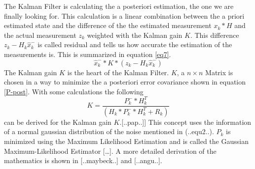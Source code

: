 The Kalman Filter is calculating the a posteriori estimation, the one we are finally looking for. This calculation is a linear combination between the a priori estimated state and the difference of the the estimated measurement $x_k*H$ and the actual measurement $z_k$ weighted with the Kalman gain $K$. This difference $z_k-H_k\hat{x}^{-}_k$ is  called residual and tells us how accurate the estimation of the measurements is. This is summarized in equation \ref{eq7}.
\begin{equation}
\hat{x}_k^{-}*K*(z_k-H_k\hat{x}^{-}_k)\label{eq7}
\end{equation}
The Kalman gain $K$ is the heart of the Kalman Filter. $K$, a $n\times n$ Matrix is chosen in a way to minimize the a posteriori error covariance shown in equation \ref{P-post}. With some calculations the following 
\begin{equation}
K=\frac{P^{-}_k*H^{T}_k}{(H_k*P^{-}_k*H^{T}_k+R_k)}
\end{equation}
can be derived for the Kalman gain $K$.[..pap..]] 
This concept uses the information of a normal gaussian distribution of the noise mentioned in (..equ2..). $P_k$ is minimized using the Maximum Likelihood Estimation and is called the  Gaussian Maximum-Likelihood Estimator […]. A more detailed derivation of the mathematics is shown in [..maybeck..] and [..angu..].

